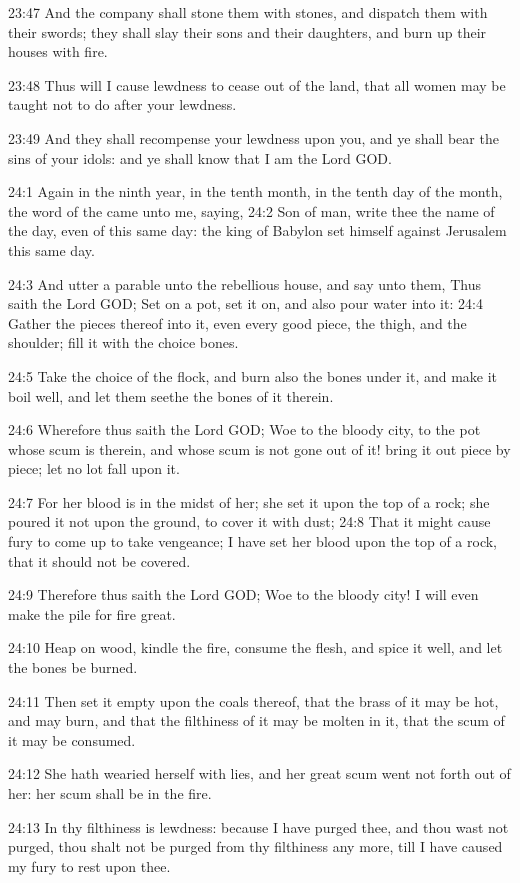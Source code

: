 23:47 And the company shall stone them with stones, and dispatch them with their swords; they shall slay their sons and their daughters, and burn up their houses with fire.

23:48 Thus will I cause lewdness to cease out of the land, that all women may be taught not to do after your lewdness.

23:49 And they shall recompense your lewdness upon you, and ye shall bear the sins of your idols: and ye shall know that I am the Lord GOD.

24:1 Again in the ninth year, in the tenth month, in the tenth day of the month, the word of the \LORD came unto me, saying, 24:2 Son of man, write thee the name of the day, even of this same day: the king of Babylon set himself against Jerusalem this same day.

24:3 And utter a parable unto the rebellious house, and say unto them, Thus saith the Lord GOD; Set on a pot, set it on, and also pour water into it: 24:4 Gather the pieces thereof into it, even every good piece, the thigh, and the shoulder; fill it with the choice bones.

24:5 Take the choice of the flock, and burn also the bones under it, and make it boil well, and let them seethe the bones of it therein.

24:6 Wherefore thus saith the Lord GOD; Woe to the bloody city, to the pot whose scum is therein, and whose scum is not gone out of it! bring it out piece by piece; let no lot fall upon it.

24:7 For her blood is in the midst of her; she set it upon the top of a rock; she poured it not upon the ground, to cover it with dust; 24:8 That it might cause fury to come up to take vengeance; I have set her blood upon the top of a rock, that it should not be covered.

24:9 Therefore thus saith the Lord GOD; Woe to the bloody city! I will even make the pile for fire great.

24:10 Heap on wood, kindle the fire, consume the flesh, and spice it well, and let the bones be burned.

24:11 Then set it empty upon the coals thereof, that the brass of it may be hot, and may burn, and that the filthiness of it may be molten in it, that the scum of it may be consumed.

24:12 She hath wearied herself with lies, and her great scum went not forth out of her: her scum shall be in the fire.

24:13 In thy filthiness is lewdness: because I have purged thee, and thou wast not purged, thou shalt not be purged from thy filthiness any more, till I have caused my fury to rest upon thee.

